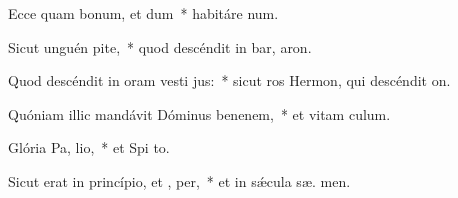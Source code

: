 \item Ecce quam bonum, et  dum~* habitáre   num.
\item Sicut unguén  pite,~* quod descéndit in bar,  aron.
\item Quod descéndit in oram vesti jus:~* sicut ros Hermon, qui descéndit   on.
\item Quóniam illic mandávit Dóminus benenem,~* et vitam   culum.
\item Glória Pa,  lio,~* et Spi to.
\item Sicut erat in princípio, et ,  per,~* et in sǽcula sæ. men.
